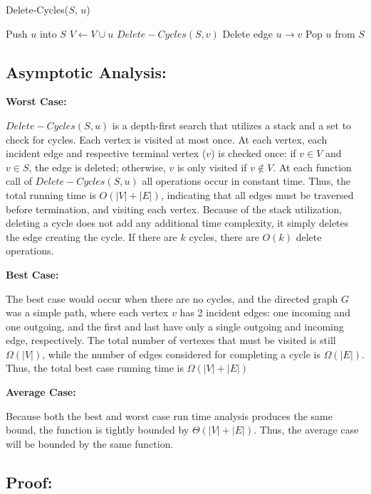 \documentclass{article}
\begin{document}
\begin{algorithm}
\caption{Delete-Cycles($S$, $u$) }
\begin{algorithmic}
\State Push $u$ into $S$
\State $V \gets V \cup u$ 
		\State $Delete-Cycles(S, v)$
		\State Delete edge $u \rightarrow v$	
	\EndIf
\EndFor
\State Pop $u$ from $S$
\State \Return
\end{algorithmic}
\end{algorithm}

\subsection*{Asymptotic Analysis:}
\noindent \textbf{Worst Case:}

$Delete-Cycles(S,u)$ is a depth-first search that utilizes a stack and a set to check for cycles.
Each vertex is visited at most once.  At each vertex, each incident edge and respective terminal vertex ($v$) is checked once:  if $v \in V$ and $v \in S$, the edge is deleted; otherwise, $v$ is only visited if $v \notin V$.
At each function call of $Delete-Cycles(S,u)$ all operations occur in constant time.  Thus, the total running time is $O(|V| + |E|)$, indicating that all edges must be traversed before termination, and visiting each vertex.
Because of the stack utilization, deleting a cycle does not add any additional time complexity, it simply deletes the edge creating the cycle.  If there are $k$ cycles, there are $O(k)$ delete operations.

\noindent \textbf{Best Case:}

The best case would occur when there are no cycles, and the directed graph $G$ was a simple path, where each vertex $v$ has 2 incident edges:  one incoming and one outgoing, and the first and last have only a single outgoing and incoming edge, respectively.
The total number of vertexes that must be visited is still $\Omega(|V|)$, while the number of edges considered for completing a cycle is $\Omega(|E|)$.  Thus, the total best case running time is $\Omega(|V| + |E|)$

\noindent \textbf{Average Case:}

Because both the best and worst case run time analysis produces the same bound, the function is tightly bounded by $\Theta(|V| + |E|)$.  Thus, the average case will be bounded by the same function.

\subsection*{Proof:}
\end{document}

